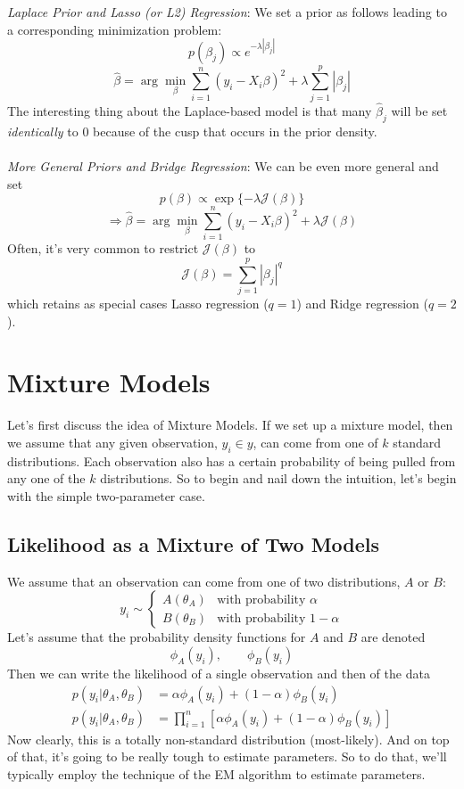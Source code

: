 \documentclass[12pt]{article}
\begin{document}
{\sl Laplace Prior and Lasso (or L2) Regression}: We set a prior
as follows leading to a corresponding minimization problem:
\[ p(\beta_j) \propto e^{-\lambda|\beta_j|} \]
\[ \hat{\beta} = \arg \min_\beta \sum^n_{i=1} 
   (y_i - X_i \beta)^2 + \lambda  \sum^p_{j=1} |\beta_j| \]
The interesting thing about the Laplace-based model is that many
$\hat{\beta}_j$ will be set \emph{identically} to 0 because of the
cusp that occurs in the prior density.
\\
\\
{\sl More General Priors and Bridge Regression}: We can be even
more general and set
   \[ p(\beta) \propto \exp\{ -\lambda \mathcal{J}(\beta) \} \]
   \[ \Rightarrow \hat{\beta} = \arg \min_\beta \sum^n_{i=1} 
      (y_i - X_i \beta)^2 + \lambda  \mathcal{J}(\beta) \]
Often, it's very common to restrict $\mathcal{J}(\beta)$ to
\[ \mathcal{J}(\beta) = \sum^p_{j=1} |\beta_j|^q \]
which retains as special cases Lasso regression ($q=1$) and 
Ridge regression ($q=2$).




\newpage
\section{Mixture Models}

Let's first discuss the idea of Mixture Models. If we set up a mixture
model, then we assume that any given observation, $y_i \in y$, can
come from one of $k$ standard distributions. Each observation
also has a certain probability of being pulled from any one of 
the $k$ distributions. So to begin and nail down the intuition, 
let's begin with the simple two-parameter case.

\subsection{Likelihood as a Mixture of Two Models}

We assume that an observation can come from one of two distributions,
$A$ or $B$:
\[ y_i\sim\begin{cases}A(\theta_A)&\text{with probability $\alpha$} \\
      B(\theta_B) & \text{with probability $1-\alpha$} \end{cases} \]
Let's assume that the probability density functions for $A$ and $B$
are denoted
   \[ \phi_A(y_i), \qquad \phi_B(y_i) \]
Then we can write the likelihood of a single observation and then
of the data
\begin{align*}
   p(y_i | \theta_A, \theta_B) &= \alpha \phi_A(y_i) + (1-\alpha)
      \phi_B(y_i) \\
   p(y_i | \theta_A, \theta_B) &= \prod^n_{i=1}
      \left[ \alpha \phi_A(y_i) + (1-\alpha)
	 \phi_B(y_i) \right]
\end{align*}
Now clearly, this is a totally non-standard distribution (most-likely).
And on top of that, it's going to be really tough to estimate 
parameters. So to do that, we'll typically employ the technique
of the EM algorithm to estimate parameters.
\end{document}
